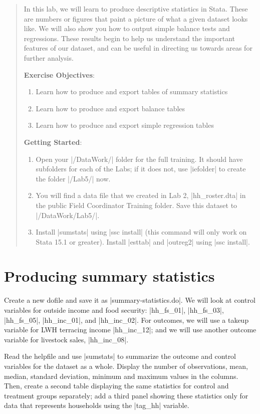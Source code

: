 \documentclass{tufte-handout}
\begin{document}
\begin{abstract}
In this lab, we will learn to produce descriptive statistics in Stata.
These are numbers or figures that paint a picture of what a given dataset looks like.
We will also show you how to output simple balance tests and regressions.
These results begin to help us understand the important features of our dataset,
and can be useful in directing us towards areas for further analysis.

\bigskip\noindent \textbf{Exercise Objectives}:
\begin{enumerate}
  \item Learn how to produce and export tables of summary statistics
  \item Learn how to produce and export balance tables
  \item Learn how to produce and export simple regression tables
\end{enumerate}

\bigskip\noindent \textbf{Getting Started}:
\begin{enumerate}
 \item Open your |/DataWork/| folder for the full training. It should have subfolders for each of the Labs; if it does not, use |iefolder| to create the folder |/Lab5/| now.
 \item You will find a data file that we created in Lab 2, |hh_roster.dta| in the public Field Coordinator Training folder. Save this dataset to |/DataWork/Lab5/|.
 \item Install |sumstats| using |ssc install| (this command will only work on Stata 15.1 or greater). Install |esttab| and |outreg2| using |ssc install|.
\end{enumerate}
\end{abstract}

\section{Producing summary statistics}

Create a new dofile and save it as |summary-statistics.do|.
We will look at control variables for outside income and food security:
|hh_fs_01|, |hh_fs_03|, |hh_fs_05|, |hh_inc_01|, and |hh_inc_02|.
For outcomes, we will use a takeup variable for LWH terracing income |hh_inc_12|;
and we will use another outcome variable for livestock sales, |hh_inc_08|.

Read the helpfile and use |sumstats| to summarize
the outcome and control variables for the dataset as a whole.
Display the number of observations, mean, median, standard deviation,
minimum and maximum values in the columns.
Then, create a second table displaying the same statistics
for control and treatment groups separately;
add a third panel showing these statistics only
for data that represents households using the |tag_hh| variable.
\end{document}
